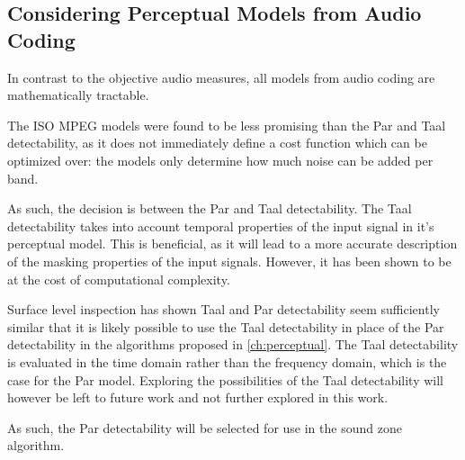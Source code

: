 \subsection{Considering Perceptual Models from Audio Coding}
\label{ch:perceptual:selection:audio_coding}
In contrast to the objective audio measures, 
all models from audio coding are mathematically tractable.

The ISO MPEG models were found to be less promising than the Par and Taal detectability, as it does not immediately 
define a cost function which can be optimized over:
the models only determine how much noise can be added per band.

As such, the decision is between the Par and Taal detectability.
The Taal detectability takes into account temporal properties of the input signal in it's perceptual model.
This is beneficial, as it will lead to a more accurate description of the masking properties of the input signals.
However, it has been shown to be at the cost of computational complexity.

Surface level inspection has shown Taal and Par detectability seem sufficiently similar that it is likely
possible to use the Taal detectability in place of the Par detectability in the algorithms
proposed in \autoref{ch:perceptual}. 
The Taal detectability is evaluated in the time domain rather than the frequency domain, which is the case for the Par model. 
Exploring the possibilities of the Taal detectability will however be left to future work and not further explored in this work.

As such, the Par detectability will be selected for use in the sound zone algorithm.
